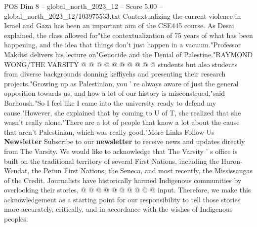 \begin{textsample}{POS Dim 8 – global\_north\_2023\_12 – Score 5.00 – global\_north\_2023\_12/103975533.txt}
Contextualizing the current violence in Israel and Gaza has been an important aim of the CSE445 course.
As Desai explained, the class allowed for"the contextualization of 75 years of what has been happening, and the idea that things don't just happen in a vacuum."Professor Makdisi delivers his lecture on"Genocide and the Denial of Palestine."RAYMOND WONG/THE VARSITY @ @ @ @ @ @ @ @ @ @ students but also students from diverse backgrounds donning keffiyehs and presenting their research projects."Growing up as Palestinian, you ' re always aware of just the general opposition towards us, and how a lot of our history is misconstrued,"said Barhoush."So I feel like I came into the university ready to defend my cause."However, she explained that by coming to U of T, she realized that she wasn't really alone."There are a lot of people that know a lot about the cause that aren't Palestinian, which was really good."More Links Follow Us \textbf{Newsletter} Subscribe to our \textbf{newsletter} to receive news and updates directly from The Varsity.
We would like to acknowledge that The Varsity ' s office is built on the traditional territory of several First Nations, including the Huron-Wendat, the Petun First Nations, the Seneca, and most recently, the Mississaugas of the Credit.
Journalists have historically harmed Indigenous communities by overlooking their stories, @ @ @ @ @ @ @ @ @ @ input.
Therefore, we make this acknowledgement as a starting point for our responsibility to tell those stories more accurately, critically, and in accordance with the wishes of Indigenous peoples.

\end{textsample}
